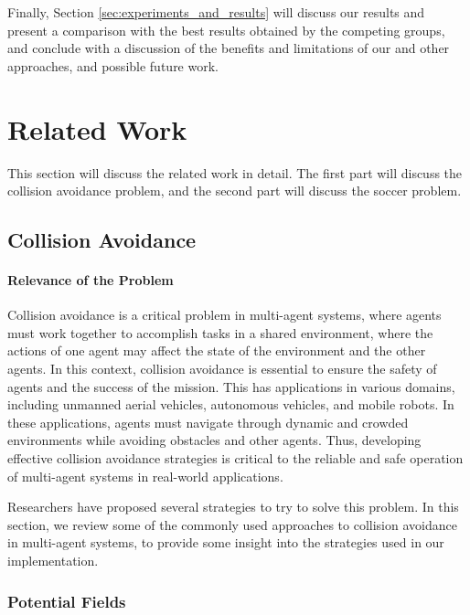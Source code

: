 \documentclass[a4paper,12pt]{article}
\begin{document}
Finally, Section \ref{sec:experiments_and_results} will discuss our results and present a comparison with the best results obtained by the competing groups, and conclude with a discussion of the benefits and limitations of our and other approaches, and possible future work.

\section{Related Work}
\label{rel_work}

This section will discuss the related work in detail. The first part will discuss the collision avoidance problem, and the second part will discuss the soccer problem.

\subsection{Collision Avoidance}
\label{rel_work_collision}

\paragraph{Relevance of the Problem}
Collision avoidance is a critical problem in multi-agent systems, where agents must work together to accomplish tasks in a shared environment, where the actions of one agent may affect the state of the environment and the other agents. In this context, collision avoidance is essential to ensure the safety of agents and the success of the mission. This has applications in various domains, including unmanned aerial vehicles, autonomous vehicles, and mobile robots. In these applications, agents must navigate through dynamic and crowded environments while avoiding obstacles and other agents. Thus, developing effective collision avoidance strategies is critical to the reliable and safe operation of multi-agent systems in real-world applications.

Researchers have proposed several strategies to try to solve this problem. In this section, we review some of the commonly used approaches to collision avoidance in multi-agent systems, to provide some insight into the strategies used in our implementation.

\subsubsection{Potential Fields}
\label{rel_work_collision_potential}
\end{document}
